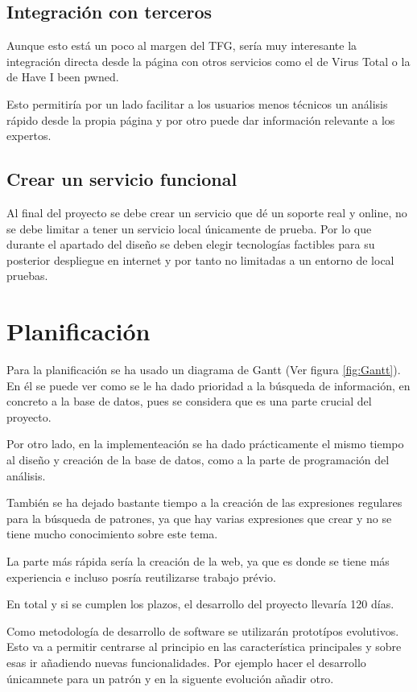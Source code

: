 \subsection{Integración con terceros}
Aunque esto está un poco al margen del TFG, sería muy interesante la integración directa desde la página con otros servicios como el de Virus Total o la de Have I been pwned.

Esto permitiría por un lado facilitar a los usuarios menos técnicos un análisis rápido desde la propia página y por otro puede dar información relevante a los expertos.

\subsection{Crear un servicio funcional}
Al final del proyecto se debe crear un servicio que dé un soporte real y online, no se debe limitar a tener un servicio local únicamente de prueba. Por lo que durante el apartado del diseño se deben elegir tecnologías factibles para su posterior despliegue en internet y por tanto no limitadas a un entorno de local pruebas.

\section{Planificación}
Para la planificación se ha usado un diagrama de Gantt (Ver figura \ref{fig:Gantt}).
En él se puede ver como se le ha dado prioridad a la búsqueda de información, en concreto a la base de datos, pues se considera que es una parte crucial del proyecto. 

Por otro lado, en la implementeación se ha dado prácticamente el mismo tiempo al diseño y creación de la base de datos, como a la parte de programación del análisis. 

También se ha dejado bastante tiempo a la creación de las expresiones regulares para la búsqueda de patrones, ya que hay varias expresiones que crear y no se tiene mucho conocimiento sobre este tema. 

La parte más rápida sería la creación de la web, ya que es donde se tiene más experiencia e incluso posría reutilizarse trabajo prévio. 

En total y si se cumplen los plazos, el desarrollo del proyecto llevaría 120 días.

Como metodología de desarrollo de software se utilizarán prototípos evolutivos. Esto va a permitir centrarse al principio en las característica principales y sobre esas ir añadiendo nuevas funcionalidades. Por ejemplo hacer el desarrollo únicamnete para un patrón y en la siguente evolución añadir otro. 

